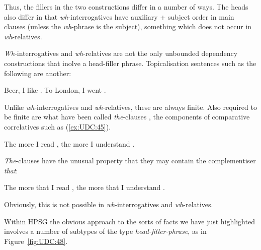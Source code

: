 \documentclass[output=paper
                ,modfonts
                ,nonflat
	        ,collection
	        ,collectionchapter
	        ,collectiontoclongg
 	        ,biblatex
                ,babelshorthands
                ,newtxmath
                ,draftmode
                ,colorlinks, citecolor=brown
]{./langsci/langscibook}
\begin{document}
{\noindent
Thus, the fillers in the two constructions differ in a number of ways.
The heads also differ in that \emph{wh}-interrogatives have auxiliary +
subject order in main clauses (unless the \emph{wh}-phrase is the
subject), something which does not occur in \emph{wh}-relatives.

\emph{Wh}-interrogatives and \emph{wh}-relatives are not the only
unbounded dependency constructions that inolve a head-filler phrase.
Topicalisation sentences such as the following are another:

\begin{exe} \ex \begin{xlist} \label{ex:UDC:44}
\ex Beer, I like \trace{}.
\ex To London, I went \trace{}.
\end{xlist}
\end{exe}

\noindent
Unlike \emph{wh}-interrogatives and \emph{wh}-relatives, these are
always finite. Also required to be finite are what have been called
\emph{the}-clauses \citep{Borsley:04,Sag:10a,Borsley:11}, the components of
comparative correlatives such as (\ref{ex:UDC:45}).

\begin{exe}
\ex \label{ex:UDC:45}
The more I read \trace{}, the more I understand \trace{}.
\end{exe}

\noindent
\emph{The}-clauses have the unusual property that they may contain
the complementiser \emph{that}:

\begin{exe}
\ex \label{ex:UDC:46}
The more that I read \trace{}, the more that I understand \trace{}.
\end{exe}

\noindent
Obviously, this is not possible in \emph{wh}-interrogatives and
\emph{wh}-relatives.

\begin{exe} \ex \begin{xlist} \label{ex:UDC:47}

\end{xlist}
\end{exe}

\noindent
Within HPSG the obvious approach to the sorts of facts we have just
highlighted involves a number of subtypes of the type
\emph{head-filler-phrase}, as in Figure~\ref{fig:UDC:48}.


\begin{figure}[htb]
  \centering


\end{figure}}
\end{document}

